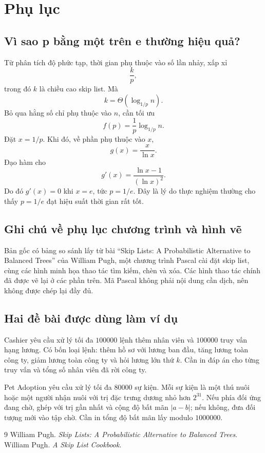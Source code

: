 \documentclass[11pt]{article}
\begin{document}
\section{Phụ lục}

\subsection{Vì sao p bằng một trên e thường hiệu quả?}

Từ phân tích độ phức tạp, thời gian phụ thuộc vào số lần nhảy, xấp xỉ
\[
  \frac{k}{p},
\]
trong đó \(k\) là chiều cao skip list. Mà
\[
  k=\Theta(\log_{1/p} n).
\]
Bỏ qua hằng số chỉ phụ thuộc vào \(n\), cần tối ưu
\[
  f(p)=\frac{1}{p}\log_{1/p} n.
\]
Đặt \(x=1/p\). Khi đó, về phần phụ thuộc vào \(x\),
\[
  g(x)=\frac{x}{\ln x}.
\]
Đạo hàm cho
\[
  g'(x)=\frac{\ln x-1}{(\ln x)^2}.
\]
Do đó \(g'(x)=0\) khi \(x=e\), tức \(p=1/e\). Đây là lý do thực nghiệm thường
cho thấy \(p=1/e\) đạt hiệu suất thời gian rất tốt.

\subsection{Ghi chú về phụ lục chương trình và hình vẽ}

Bản gốc có bảng so sánh lấy từ bài ``Skip Lists: A Probabilistic Alternative
to Balanced Trees'' của William Pugh, một chương trình Pascal cài đặt skip
list, cùng các hình minh họa thao tác tìm kiếm, chèn và xóa. Các hình thao tác
chính đã được vẽ lại ở các phần trên. Mã Pascal không phải nội dung cần dịch,
nên không được chép lại đầy đủ.

\subsection{Hai đề bài được dùng làm ví dụ}

Cashier yêu cầu xử lý tối đa \(100000\) lệnh thêm nhân viên và \(100000\) truy
vấn hạng lương. Có bốn loại lệnh: thêm hồ sơ với lương ban đầu, tăng lương
toàn công ty, giảm lương toàn công ty và hỏi lương lớn thứ \(k\). Cần in đáp
án cho từng truy vấn và tổng số nhân viên đã rời công ty.

Pet Adoption yêu cầu xử lý tối đa \(80000\) sự kiện. Mỗi sự kiện là một thú
nuôi hoặc một người nhận nuôi với trị đặc trưng dương nhỏ hơn \(2^{31}\). Nếu
phía đối ứng đang chờ, ghép với trị gần nhất và cộng độ bất mãn
\(|a-b|\); nếu không, đưa đối tượng mới vào tập chờ. Cần in tổng độ bất mãn
lấy modulo \(1000000\).

\begin{thebibliography}{9}
William Pugh. \emph{Skip Lists: A Probabilistic Alternative to Balanced Trees}.
William Pugh. \emph{A Skip List Cookbook}.
\end{thebibliography}
\end{document}
